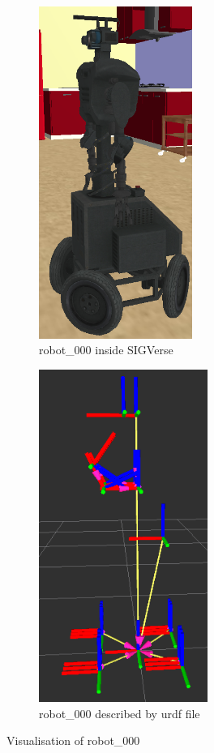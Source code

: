 \begin{figure}[h]
\centering
\begin{subfigure}{.5\textwidth}
  \centering
  \includegraphics[width=50mm]{images/robot_000_sigverse.png}
  \caption{robot\_000 inside SIGVerse}
  \label{fig:robotSig}
\end{subfigure}%
\begin{subfigure}{.5\textwidth}
  \centering
  \includegraphics[width=55mm]{images/robot_000_rviz.png}
  \caption{robot\_000 described by urdf file}
  \label{fig:robotRviz}
\end{subfigure}
\caption{Visualisation of robot\_000}
\label{fig:robotVisu}
\end{figure}

